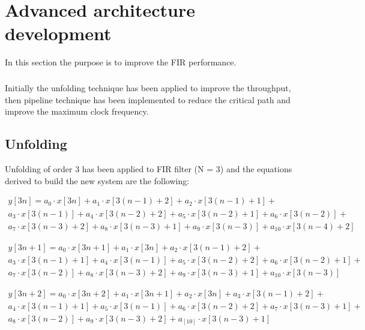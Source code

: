 %
\chapter{Advanced architecture development}
\label{cha3}

In this section the purpose is to improve the FIR performance. 
\paragraph{}
Initially the unfolding 
technique has been applied to improve the throughput, then pipeline technique has 
been implemented to reduce the critical path and improve the maximum clock frequency.

\section{Unfolding}

Unfolding of order 3 has been applied to FIR filter (N = 3) and the equations derived
to build the new system are the following:

\begin{equation}
\begin{split}
    y[3n] = a_0 \cdot x[3n] + a_1 \cdot x[3(n-1) + 2] + a_2 \cdot x[3(n-1) + 1] + \\
    a_3 \cdot x[3(n-1)] + a_4 \cdot x[3(n-2) + 2] + a_5 \cdot x[3(n-2) + 1] + a_6 \cdot x[3(n-2)] +  \\
    a_7 \cdot x[3(n-3) + 2] + a_8 \cdot x[3(n-3) + 1] + a_9 \cdot x[3(n-3)] + a_{10} \cdot x[3(n-4) + 2]
\end{split}
\end{equation}

\begin{equation}
\begin{split}
    y[3n + 1] = a_0 \cdot x[3n + 1] + a_1 \cdot x[3n] + a_2 \cdot x[3(n-1) + 2] + \\
    a_3 \cdot x[3(n-1) + 1] + a_4 \cdot x[3(n-1)] + a_5 \cdot x[3(n-2) + 2] + a_6 \cdot x[3(n-2)+1] +  \\
    a_7 \cdot x[3(n-2)] + a_8 \cdot x[3(n-3)+2] + a_9 \cdot x[3(n-3) + 1] + a_{10} \cdot x[3(n-3)]
\end{split}
\end{equation}

\begin{equation}
\begin{split}
    y[3n + 2] = a_0 \cdot x[3n + 2] + a_1 \cdot x[3n + 1] + a_2 \cdot x[3n] + a_3 \cdot x[3(n-1) + 2] +\\
    a_4 \cdot x[3(n-1) + 1] + a_5 \cdot x[3(n-1)] + a_6 \cdot x[3(n-2) + 2] +  a_7 \cdot x[3(n-3) + 1] +\\
    a_8 \cdot x[3(n-2)] + a_9 \cdot x[3(n-3) + 2] + a_[10] \cdot x[3(n-3) + 1]
\end{split}
\end{equation}

